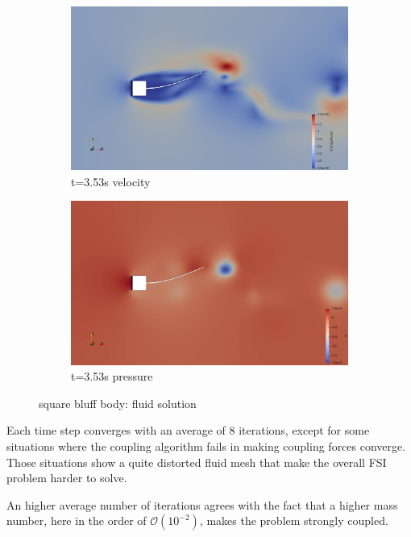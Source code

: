 \begin{figure}[htb]
\begin{subfigure}{0.5\textwidth}
  \includegraphics[width=\linewidth]{images/sq-cyl/sq_v3.png}
  \caption{t=3.53s velocity}
  \label{fig:sq_v3}
\end{subfigure}\hfil %
\begin{subfigure}{0.5\textwidth}
  \includegraphics[width=\linewidth]{images/sq-cyl/sq_p3.png}
  \caption{t=3.53s pressure}
  \label{fig:sq_p3}
\end{subfigure}\hfil %

\caption{square bluff body: fluid solution}
\label{fig:sq_sol}
\end{figure}


Each time step converges with an average of 8 iterations, except for some situations where the coupling algorithm fails in making coupling forces converge. Those situations show a quite distorted fluid mesh that make the overall FSI problem harder to solve.

An higher average number of iterations agrees with the fact that a higher mass number, here in the order of $\mathcal{O} \left(10^{-2} \right) $, makes the problem strongly coupled.

